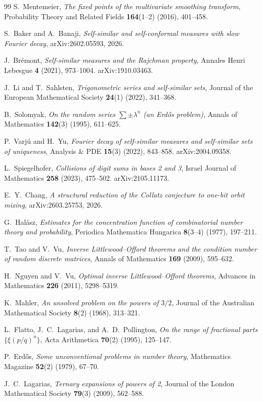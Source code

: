 \documentclass[11pt]{article}
\theoremstyle{definition}
\theoremstyle{remark}
\begin{document}
\begin{thebibliography}{99}
 S.\ Mentemeier, \emph{The fixed points of the
  multivariate smoothing transform}, Probability Theory and Related
  Fields \textbf{164}(1--2) (2016), 401--458.

 S.\ Baker and A.\ Banaji, \emph{Self-similar
  and self-conformal measures with slow Fourier decay},
  arXiv:2602.05593, 2026.

 J.\ Br\'emont, \emph{Self-similar measures and the
  Rajchman property}, Annales Henri Lebesgue \textbf{4} (2021),
  973--1004. arXiv:1910.03463.

 J.\ Li and T.\ Sahlsten, \emph{Trigonometric
  series and self-similar sets}, Journal of the European Mathematical
  Society \textbf{24}(1) (2022), 341--368.

 B.\ Solomyak, \emph{On the random series
  $\sum\pm\lambda^n$ (an Erd\H{o}s problem)}, Annals of Mathematics
  \textbf{142}(3) (1995), 611--625.

 P.\ Varj\'u and H.\ Yu, \emph{Fourier decay of
  self-similar measures and self-similar sets of uniqueness}, Analysis
  \& PDE \textbf{15}(3) (2022), 843--858. arXiv:2004.09358.

 L.\ Spiegelhofer, \emph{Collisions of digit
  sums in bases 2 and 3}, Israel Journal of Mathematics \textbf{258}
  (2023), 475--502. arXiv:2105.11173.

 E.\ Y.\ Chang, \emph{A structural reduction of the
  Collatz conjecture to one-bit orbit mixing}, arXiv:2603.25753, 2026.

 G.\ Hal\'asz, \emph{Estimates for the
  concentration function of combinatorial number theory and
  probability}, Periodica Mathematica Hungarica \textbf{8}(3--4)
  (1977), 197--211.

 T.\ Tao and V.\ Vu, \emph{Inverse Littlewood--Offord
  theorems and the condition number of random discrete matrices},
  Annals of Mathematics \textbf{169} (2009), 595--632.

 H.\ Nguyen and V.\ Vu, \emph{Optimal inverse
  Littlewood--Offord theorems}, Advances in Mathematics \textbf{226}
  (2011), 5298--5319.

 K.\ Mahler, \emph{An unsolved problem on the powers
  of $3/2$}, Journal of the Australian Mathematical Society
  \textbf{8}(2) (1968), 313--321.

 L.\ Flatto, J.\ C.\ Lagarias,
  and A.\ D.\ Pollington, \emph{On the range of fractional parts
  $\{\xi(p/q)^n\}$}, Acta Arithmetica \textbf{70}(2) (1995), 125--147.

 P.\ Erd\H{o}s, \emph{Some unconventional problems
  in number theory}, Mathematics Magazine \textbf{52}(2) (1979),
  67--70.

 J.\ C.\ Lagarias, \emph{Ternary expansions of
  powers of 2}, Journal of the London Mathematical Society
  \textbf{79}(3) (2009), 562--588.

\end{thebibliography}
\end{document}
